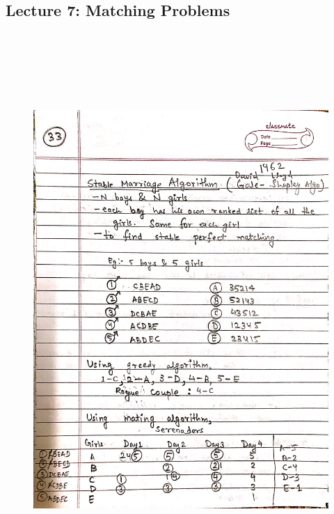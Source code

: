 \newpage
{\color{black} \subsection*{Lecture 7: Matching Problems}}
\begin{figure}[H]
    \centering
    \includegraphics[width=16cm, height=21cm]{"./MIT-6.042J/MIT-6042J-033"}
\end{figure}

